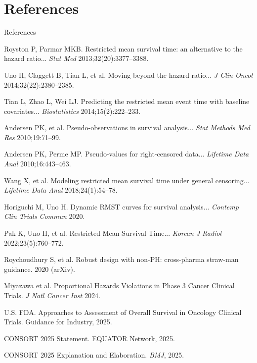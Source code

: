 \documentclass{beamer}
\begin{document}
\appendix
\section{References}

\begin{frame}[allowframebreaks]{References}
\small
\begin{thebibliography}{99}
Royston P, Parmar MKB. Restricted mean survival time: an alternative to the hazard ratio... \emph{Stat Med} 2013;32(20):3377–3388.

Uno H, Claggett B, Tian L, et al. Moving beyond the hazard ratio... \emph{J Clin Oncol} 2014;32(22):2380–2385.

Tian L, Zhao L, Wei LJ. Predicting the restricted mean event time with baseline covariates... \emph{Biostatistics} 2014;15(2):222–233.

Andersen PK, et al. Pseudo-observations in survival analysis... \emph{Stat Methods Med Res} 2010;19:71–99.

Andersen PK, Perme MP. Pseudo-values for right-censored data... \emph{Lifetime Data Anal} 2010;16:443–463.

Wang X, et al. Modeling restricted mean survival time under general censoring... \emph{Lifetime Data Anal} 2018;24(1):54–78.

Horiguchi M, Uno H. Dynamic RMST curves for survival analysis... \emph{Contemp Clin Trials Commun} 2020.

Pak K, Uno H, et al. Restricted Mean Survival Time... \emph{Korean J Radiol} 2022;23(5):760–772.

Roychoudhury S, et al. Robust design with non-PH: cross-pharma straw-man guidance. 2020 (arXiv).

Miyazawa et al. Proportional Hazards Violations in Phase 3 Cancer Clinical Trials. \emph{J Natl Cancer Inst} 2024.

U.S. FDA. Approaches to Assessment of Overall Survival in Oncology Clinical Trials. Guidance for Industry, 2025.

CONSORT 2025 Statement. EQUATOR Network, 2025.

CONSORT 2025 Explanation and Elaboration. \emph{BMJ}, 2025.
\end{thebibliography}
\end{frame}
\end{document}
